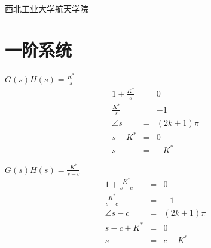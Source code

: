 \DeclareMathOperator*{\argmin}{arg\,min}
\usetikzlibrary{shapes,arrows,positioning,decorations}
\usetikzlibrary{decorations.pathmorphing} 
\usetikzlibrary{decorations.shapes} 
\usetikzlibrary{decorations.fractals} 
\usetikzlibrary{spy} %

\newcommand{\vect}[1]{\boldsymbol{#1}}

\def\lecturename{自动控制原理}

\title{\insertlecture}

\author{邢超}

\institute
{
  西北工业大学航天学院
}


\subtitle{特殊的根轨迹}
\date{2014}



\begin{frame}
  \maketitle
\end{frame}

\section{一阶系统}

\begin{frame}{$G(s)H(s)=\frac{K^*}{s}$}
\begin{eqnarray}
1+\frac{K^*}{s} &=& 0 \\
\frac{K^*}{s} &=& -1 \\
\angle{s}&=&(2k+1)\pi \\
s+K^* &=& 0 \\
s &=& -K^* 
\end{eqnarray}
\end{frame}

\begin{frame}{$G(s)H(s)=\frac{K^*}{s-c}$}
\begin{eqnarray}
1+\frac{K^*}{s-c} &=& 0 \\
\frac{K^*}{s-c} &=& -1 \\
\angle{s-c}&=&(2k+1)\pi \\
s-c+K^* &=& 0 \\
s &=& c-K^*
\end{eqnarray}
\end{frame}

